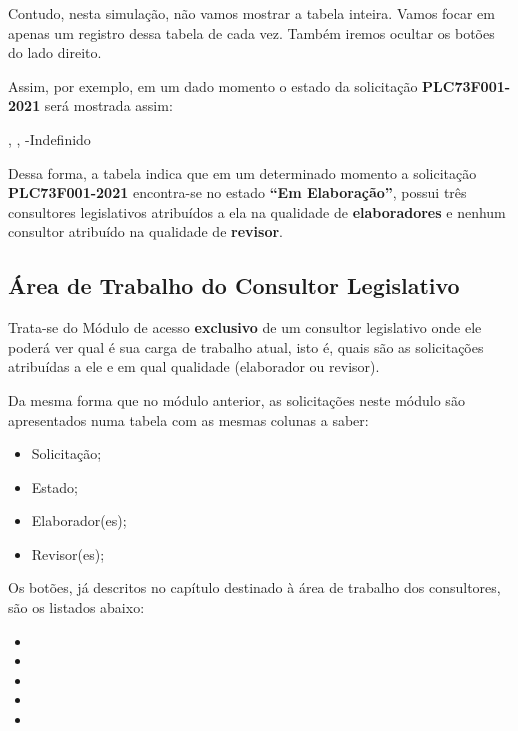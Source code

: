 \begin{landscape}
	Contudo, nesta simulação, não vamos mostrar a tabela inteira. Vamos focar em apenas um registro dessa tabela de cada vez. Também iremos ocultar os botões do lado direito. 
	
	Assim, por exemplo, em um dado momento o estado da solicitação \textbf{PLC73F001-2021} será mostrada assim:
	
	{}{\EU, \ET, \EQ}{-}{Indefinido}

	Dessa forma, a tabela indica que em um determinado momento a solicitação \textbf{PLC73F001-2021} encontra-se no estado \textbf{``Em Elaboração''}, possui três consultores legislativos atribuídos a ela na qualidade de \textbf{elaboradores} e nenhum consultor atribuído na qualidade de \textbf{revisor}.
	
	\pagebreak
	
\subsection*{Área de Trabalho do Consultor Legislativo}
	
	Trata-se do Módulo de acesso \textbf{exclusivo} de um consultor legislativo onde ele poderá ver qual é sua carga de trabalho atual, isto é, quais são as solicitações atribuídas a ele e em qual qualidade (elaborador ou revisor).

	Da mesma forma que no módulo anterior, as solicitações neste módulo são apresentados numa tabela com as mesmas colunas a saber:
	
	\begin{itemize}
		\item Solicitação;
		\item Estado;
		\item Elaborador(es);
		\item Revisor(es);
	\end{itemize}	

	Os botões, já descritos no capítulo destinado à área de trabalho dos consultores, são os listados abaixo:
	
	\begin{itemize}
		\item \bVisualizar
		\item \bDetalhes
		\item \bAvaliar
		\item \bDesistir
		\item \bConcluir
	\end{itemize}		


\end{landscape}

